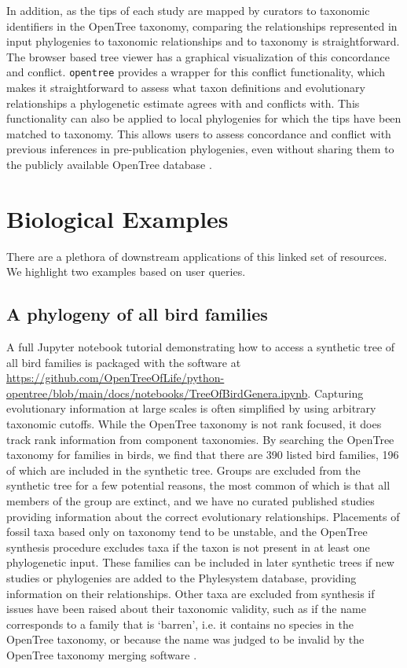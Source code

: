 \documentclass[oupdraft]{sysbio_sse}
\begin{document}
In addition, as the tips of each study are mapped by curators to taxonomic identifiers in the OpenTree taxonomy, comparing the relationships represented in input phylogenies to taxonomic relationships and to taxonomy is straightforward. The browser based tree viewer has a graphical visualization of this concordance and conflict. \texttt{opentree} provides a wrapper for this conflict functionality, which makes it straightforward to assess what taxon definitions and evolutionary relationships a phylogenetic estimate agrees with and conflicts with. This functionality can also be applied to local phylogenies for which the tips have been matched to taxonomy. This allows users to assess concordance and conflict with previous inferences in pre-publication phylogenies, even without sharing them to the publicly available OpenTree database \citep{reyes_physcraper_2020, mctavish_phylesystem_2015}.



\bigskip

\section{Biological Examples}
\label{sec4}

There are a plethora of downstream applications of this linked set of resources.
We highlight two examples based on user queries.


\subsection{A phylogeny of all bird families}
A full Jupyter notebook tutorial demonstrating how to access a synthetic tree of all bird families is packaged with the software at \url{https://github.com/OpenTreeOfLife/python-opentree/blob/main/docs/notebooks/TreeOfBirdGenera.ipynb}.
Capturing evolutionary information at large scales is often simplified by using arbitrary taxonomic cutoffs.
While the OpenTree taxonomy is not rank focused, it does track rank information from component taxonomies.
By searching the OpenTree taxonomy for families in birds, we find that there are 390 listed bird families, 196 of which are included in the synthetic tree.
Groups are excluded from the synthetic tree for a few potential reasons, the most common of which is that all members of the group are extinct, and we have no curated published studies providing information about the correct evolutionary relationships.
Placements of fossil taxa based only on taxonomy tend to be unstable, and the OpenTree synthesis procedure excludes taxa if the taxon is not present in at least one  phylogenetic input.
These families can be included in later synthetic trees if new studies or phylogenies are added to the Phylesystem database, providing information on their relationships.
Other taxa are excluded from synthesis if issues have been raised about their taxonomic validity, such as if the name corresponds to a family that is `barren', i.e. it contains no species in the OpenTree taxonomy, or because the name was judged to be invalid by the OpenTree taxonomy merging software \citep{rees_automated_2017}.
\end{document}

